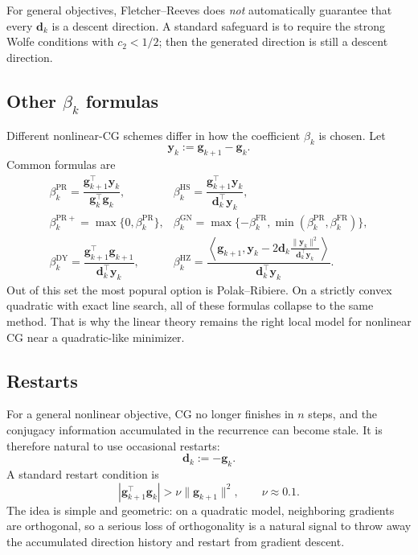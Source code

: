 For general objectives, Fletcher--Reeves does \emph{not} automatically
guarantee that every $\mathbf{d}_k$ is a descent direction. A standard
safeguard is to require the strong Wolfe conditions with $c_2<1/2$; then the
generated direction is still a descent direction. 

\subsection{Other \texorpdfstring{$\beta_k$}{beta} formulas}
Different nonlinear-CG schemes differ in how the coefficient $\beta_k$ is
chosen. Let
\[
  \mathbf{y}_k:=\mathbf{g}_{k+1}-\mathbf{g}_k.
\]
Common formulas are
\[
\begin{array}{ll}
  \beta_k^{\mathrm{PR}}
  =\dfrac{\mathbf{g}_{k+1}^{\top}\mathbf{y}_k}{\mathbf{g}_k^{\top}\mathbf{g}_k},
  &
  \beta_k^{\mathrm{HS}}
  =\dfrac{\mathbf{g}_{k+1}^{\top}\mathbf{y}_k}{\mathbf{d}_k^{\top}\mathbf{y}_k},
  \\[10pt]
  \beta_k^{\mathrm{PR+}}
  =\max\{0,\beta_k^{\mathrm{PR}}\},
  &
  \beta_k^{\mathrm{GN}}
  =\max\{-\beta_k^{\mathrm{FR}},
  \min(\beta_k^{\mathrm{PR}},\beta_k^{\mathrm{FR}})\},
  \\[10pt]
  \beta_k^{\mathrm{DY}}
  =\dfrac{\mathbf{g}_{k+1}^{\top}\mathbf{g}_{k+1}}{\mathbf{d}_k^{\top}\mathbf{y}_k},
  &
  \beta_k^{\mathrm{HZ}}
  =\dfrac{\left\langle \mathbf{g}_{k+1},
  \mathbf{y}_k
  -2\mathbf{d}_k\frac{\|\mathbf{y}_k\|^2}{\mathbf{d}_k^{\top}\mathbf{y}_k}
  \right\rangle}
  {\mathbf{d}_k^{\top}\mathbf{y}_k}.
\end{array}
\]
Out of this set the most popural option is Polak--Ribiere.
On a strictly convex quadratic with exact line search, all of these formulas
collapse to the same method. That is why the linear theory remains the right
local model for nonlinear CG near a quadratic-like minimizer.

\subsection{Restarts}
For a general nonlinear objective, CG no longer finishes in $n$ steps, and the
conjugacy information accumulated in the recurrence can become stale. It is
therefore natural to use occasional restarts:
\[
  \mathbf{d}_k:=-\mathbf{g}_k.
\]
A standard restart condition is
\begin{equation}
  \label{eq:ch5-restart}
  |\mathbf{g}_{k+1}^{\top}\mathbf{g}_k|
  > \nu \|\mathbf{g}_{k+1}\|^2,
  \qquad
  \nu\approx 0.1.
\end{equation}
The idea is simple and geometric: on a quadratic model, neighboring gradients
are orthogonal, so a serious loss of orthogonality is a natural signal to throw
away the accumulated direction history and restart from gradient descent. 

